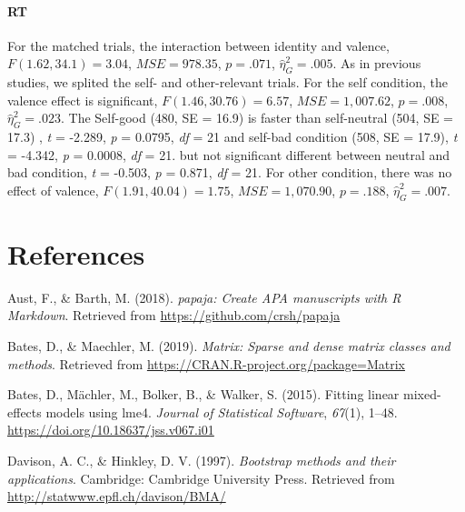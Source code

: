 \documentclass[man]{apa6}
\let\oldparagraph\paragraph
\renewcommand{\paragraph}[1]{\oldparagraph{#1}\mbox{}}
\begin{document}
\hypertarget{rt-1}{%
\paragraph{RT}\label{rt-1}}

For the matched trials, the interaction between identity and valence, \(F(1.62, 34.1) = 3.04\), \(\mathit{MSE} = 978.35\), \(p = .071\), \(\hat{\eta}^2_G = .005\). As in previous studies, we splited the self- and other-relevant trials. For the self condition, the valence effect is significant, \(F(1.46, 30.76) = 6.57\), \(\mathit{MSE} = 1,007.62\), \(p = .008\), \(\hat{\eta}^2_G = .023\). The Self-good (480, SE = 16.9) is faster than self-neutral (504, SE = 17.3) , \emph{t} = -2.289, \emph{p} = 0.0795, \emph{df} = 21 and self-bad condition (508, SE = 17.9), \emph{t} = -4.342, \emph{p} = 0.0008, \emph{df} = 21. but not significant different between neutral and bad condition, \emph{t} = -0.503, \emph{p} = 0.871, \emph{df} = 21. For other condition, there was no effect of valence, \(F(1.91, 40.04) = 1.75\), \(\mathit{MSE} = 1,070.90\), \(p = .188\), \(\hat{\eta}^2_G = .007\).

\newpage

\hypertarget{references}{%
\section{References}\label{references}}

\begingroup
\setlength{\parindent}{-0.5in}
\setlength{\leftskip}{0.5in}

\hypertarget{refs}{}
\leavevmode\hypertarget{ref-R-papaja}{}%
Aust, F., \& Barth, M. (2018). \emph{papaja: Create APA manuscripts with R Markdown}. Retrieved from \url{https://github.com/crsh/papaja}

\leavevmode\hypertarget{ref-R-Matrix}{}%
Bates, D., \& Maechler, M. (2019). \emph{Matrix: Sparse and dense matrix classes and methods}. Retrieved from \url{https://CRAN.R-project.org/package=Matrix}

\leavevmode\hypertarget{ref-R-lme4}{}%
Bates, D., Mächler, M., Bolker, B., \& Walker, S. (2015). Fitting linear mixed-effects models using lme4. \emph{Journal of Statistical Software}, \emph{67}(1), 1--48. \url{https://doi.org/10.18637/jss.v067.i01}

\leavevmode\hypertarget{ref-R-boot}{}%
Davison, A. C., \& Hinkley, D. V. (1997). \emph{Bootstrap methods and their applications}. Cambridge: Cambridge University Press. Retrieved from \url{http://statwww.epfl.ch/davison/BMA/}
\end{document}
